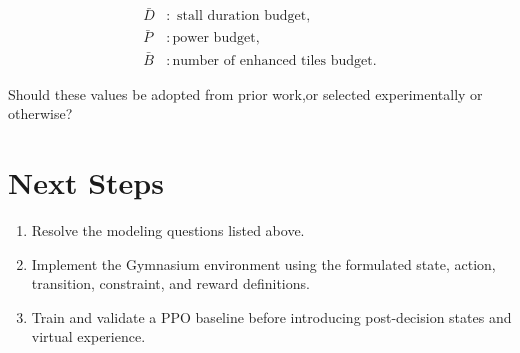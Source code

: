 \documentclass[10pt,conference]{IEEEtran}
\begin{document}
\[
\begin{aligned}
\bar{D} &: \text{ stall duration budget},\\
\bar{P} &: \text{power budget},\\
\bar{B} &: \text{number of enhanced tiles budget}.
\end{aligned}
\]

\noindent
Should these values be adopted from prior work,or selected experimentally or otherwise?
\section{Next Steps}

\begin{enumerate}
    \item Resolve the modeling questions listed above.
    \item Implement the Gymnasium environment using the formulated state,
    action, transition, constraint, and reward definitions.
    \item Train and validate a PPO baseline before introducing
    post-decision states and virtual experience.
\end{enumerate}
\end{document}
